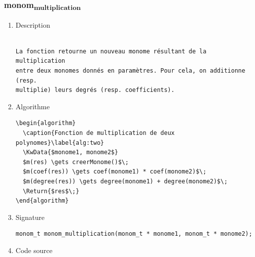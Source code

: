\documentclass[11pt]{article}
\begin{document}
\subsubsection{monom\textsubscript{multiplication}}
\label{sec:orgf30e590}
\begin{enumerate}
\item Description
\label{sec:org2696361}

\begin{verbatim}

La fonction retourne un nouveau monome résultant de la multiplication
entre deux monomes donnés en paramètres. Pour cela, on additionne (resp.
multiplie) leurs degrés (resp. coefficients).

\end{verbatim}

\item Algorithme
\label{sec:org75f60f3}

\begin{verbatim}
\begin{algorithm}
  \caption{Fonction de multiplication de deux polynomes}\label{alg:two}
  \KwData{$monome1, monome2$}
  $m(res) \gets creerMonome()$\;
  $m(coef(res)) \gets coef(monome1) * coef(monome2)$\;
  $m(degree(res)) \gets degree(monome1) + degree(monome2)$\;
  \Return{$res$\;}
\end{algorithm}
\end{verbatim}

\item Signature
\label{sec:org213e55a}

\begin{verbatim}
monom_t monom_multiplication(monom_t * monome1, monom_t * monome2);
\end{verbatim}

\item Code source
\label{sec:orgefa9427}


\end{enumerate}
\end{document}
